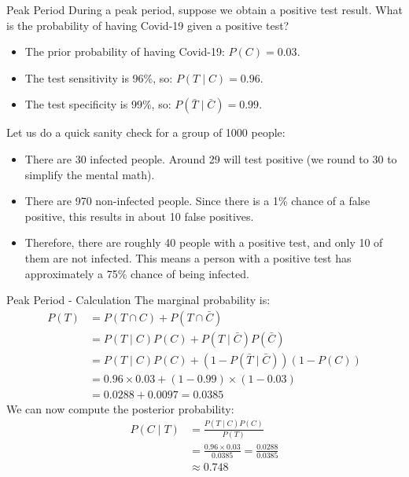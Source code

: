 \begin{frame}{Peak Period}
	During a peak period, suppose we obtain a positive test result. What is the probability of having Covid-19 given a positive test?
	\begin{itemize}
		\item The prior probability of having Covid-19: $P(C) = 0.03$. 
		\item The test sensitivity is 96\%, so: $P(T \mid C) = 0.96$.
		\item The test specificity is 99\%, so: $P(\bar{T} \mid \bar{C}) = 0.99$.
	\end{itemize}
	\vspace{0.5cm}
	\pause
	Let us do a quick sanity check for a group of 1000 people:
	\begin{itemize}
		\item There are 30 infected people. Around 29 will test positive (we round to 30 to simplify the mental math).
		\pause
		\item There are 970 non-infected people. Since there is a 1\% chance of a false positive, this results in about 10 false positives.
		\pause
		\item Therefore, there are roughly 40 people with a positive test, and only 10 of them are not infected. This means a person with a positive test has approximately a 75\% chance of being infected.
	\end{itemize}
\end{frame}

\begin{frame}{Peak Period - Calculation}
	The marginal probability is:
	\begin{equation}
		\begin{aligned}
			P(T) &= P(T \cap C) + P(T \cap \bar{C}) \\
			&= P(T \mid C) P(C) + P(T \mid \bar{C}) P(\bar{C}) \\
			&= P(T \mid C) P(C) + (1 - P(\bar{T} \mid \bar{C})) (1 - P(C)) \\
			&= 0.96 \times 0.03 + (1 - 0.99) \times (1 - 0.03) \\
			&= 0.0288 + 0.0097 = 0.0385
		\end{aligned}
		\nonumber
	\end{equation}
	\pause
	We can now compute the posterior probability:
	\begin{equation}
		\begin{aligned}
			P(C \mid T) &= \frac{P(T \mid C) P(C)}{P(T)} \\
			&= \frac{0.96 \times 0.03}{0.0385} 
			= \frac{0.0288}{0.0385} \\
			&\approx 0.748
		\end{aligned}
		\nonumber
	\end{equation}
\end{frame}


